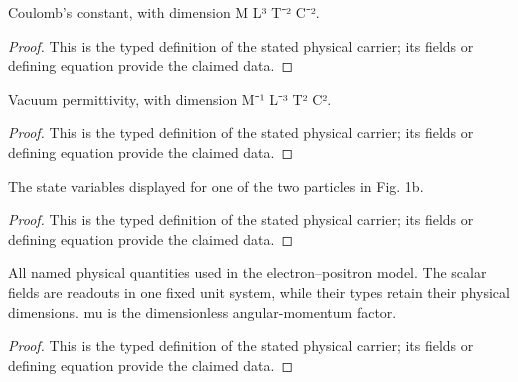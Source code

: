 \begin{definition}
  \label{def:physics:IPhO_2026_1_B_1:aux008}
  Coulomb's constant, with dimension M L³ T⁻² C⁻².
\end{definition}
\begin{proof}
  This is the typed definition of the stated physical carrier; its fields or defining equation provide the claimed data.
\end{proof}

\begin{definition}
  \label{def:physics:IPhO_2026_1_B_1:aux009}
  Vacuum permittivity, with dimension M⁻¹ L⁻³ T² C².
\end{definition}
\begin{proof}
  This is the typed definition of the stated physical carrier; its fields or defining equation provide the claimed data.
\end{proof}

\begin{definition}
  \label{def:physics:IPhO_2026_1_B_1:aux010}
  The state variables displayed for one of the two particles in Fig. 1b.
\end{definition}
\begin{proof}
  This is the typed definition of the stated physical carrier; its fields or defining equation provide the claimed data.
\end{proof}

\begin{definition}
  \label{def:physics:IPhO_2026_1_B_1:aux011}
  All named physical quantities used in the electron--positron model. The scalar fields are readouts in one fixed unit system, while their types retain their physical dimensions. mu is the dimensionless angular-momentum factor.
\end{definition}
\begin{proof}
  This is the typed definition of the stated physical carrier; its fields or defining equation provide the claimed data.
\end{proof}

